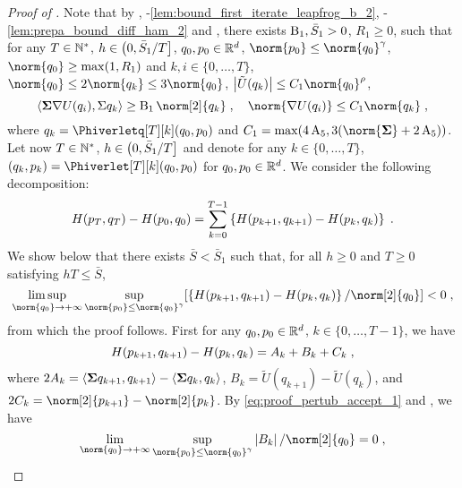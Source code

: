 \begin{proof}[Proof of ]
  Note that by , -\ref{lem:bound_first_iterate_leapfrog_b_2}, -\ref{lem:prepa_bound_diff_ham_2} and , there exists $\operatorname{B}_1,\bar{S}_1 >0$, $R_1 \geq 0$, such that for any $T \in \mathbb{N}^{*}$, $h \in \left(0,\bar{S}_1/T\right]$, $q_0,p_0 \in \mathbb{R}^d$, $\norm{p_0} \leq \norm{q_0}^{\gamma}$, $\norm{q_0} \geq \max(1,R_1)$ and $k,i \in \{0, \ldots,T\}$, $\norm{q_0} \leq 2 \norm{q_k} \leq 3 \norm{q_0}$, $\abs{\tilde{U}(q_k)} \leq C_1 \norm{q_0}^{\rho}$, 
  \begin{equation}
\label{eq:proof_pertub_accept_1}
 \ps{\Sigmabf \nabla U(q_i)}{\Sigma q_k} \geq \BB_1 \norm[2]{q_k}  \eqsp, \quad  \norm{\nabla U(q_i)} \leq C_1 \norm{q_k} \eqsp,
  \end{equation}
  where $q_k = \Phiverletq[T][k](q_0,p_0)$ and  $C_1= \max(4\constfive, 3(\norm{\Sigmabf} + 2 \constfive))$.
  Let now $T \in \mathbb{N}^{*}$, $h \in \left(0,\bar{S}_1/T\right]$ and denote for any $k \in \{0,\ldots,T\}$, $(q_k,p_k) = \Phiverlet[T][k](q_0,p_0)$ for $q_0,p_0 \in \mathbb{R}^d$. We consider the following decomposition:
  \begin{equation}
\label{eq:proof_pertub_accept_2}
H(p_T,q_T)-H(p_0,q_0)=\sum_{k=0}^{T-1}\left\lbrace H(p_{k+1},q_{k+1})-H(p_{k},q_{k}) \right\rbrace \;.
\end{equation}
We show below that there exists $\bar{S} < \bar{S}_1$ such that, for all $h \geq 0$ and $T \geq 0$ satisfying $hT \leq \bar{S}$,
\begin{equation}
\label{eq:proof_pertub_accept_3}
\limsup_{\norm{q_0} \to \plusinfty} \sup_{\norm{p_0} \leq \norm{q_0}^{\gamma}} [ \defEns{H(p_{k+1},q_{k+1})-H(p_{k},q_{k})}/\norm[2]{q_0}] <0 \eqsp,
\end{equation}
from which  the proof follows.
First for any $q_0,p_0 \in \mathbb{R}^d$, $k \in \{0,\ldots,T-1\}$, we have
\begin{equation}
\label{eq:proof_pertub_accept_4}
  H(p_{k+1},q_{k+1})-H(p_{k},q_{k}) = A_k + B_k + C_k \;,
\end{equation}
where $2 A_k =  \left\langle\boldsymbol{\Sigma} q_{k+1},q_{k+1} \right\rangle - \left\langle\boldsymbol{\Sigma} q_{k},q_{k} \right\rangle$,
$B_k = \tilde{U}(q_{k+1}) - \tilde{U}(q_k)$, and $2 C_k = \norm[2]{p_{k+1}} - \norm[2]{p_k}$.
By \eqref{eq:proof_pertub_accept_1} and , we have
\begin{equation}
\label{eq:proof_pertub_accept_6}
  \lim_{\norm{q_0} \to \plusinfty} \sup_{\norm{p_0} \leq \norm{q_0}^\gamma} \abs{B_k}/\norm[2]{q_0} =0 \eqsp,

\end{equation}
\end{proof}
